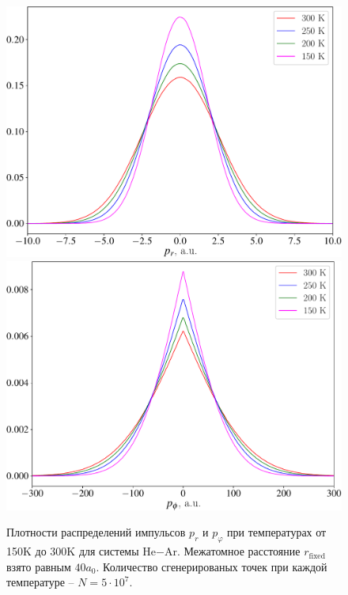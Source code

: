 \begin{figure}[H]
    \centering
    \includegraphics[width=0.75\linewidth]{./pictures/two_atom_distributions/pR-crop.pdf} \\
    \includegraphics[width=0.75\linewidth]{./pictures/two_atom_distributions/pPhi-crop.pdf}
    \caption{Плотности распределений импульсов $p_r$ и $p_\varphi$ при температурах от 150K до 300K для системы He$-$Ar. Межатомное расстояние $r_\text{fixed}$ взято равным $40 a_0$. Количество сгенерированых точек при каждой температуре -- $N = 5 \cdot 10^7$.}
\end{figure}

